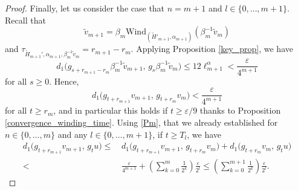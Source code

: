 \documentclass[10pt,a4paper]{amsart}
\begin{document}
\begin{proof}
Finally, let us consider the case that $n=m+1$ and $l\in \{0,\dots,m+1\}$. 
Recall that \[\tilde v_{m+1}=\beta_m \mathrm{Wind}_{(\tilde  H'_{m+1}, \alpha_{m+1})}(\beta_m^{-1} \tilde v_m)\] and $\tau_{\tilde H_{m+1}', \alpha_{m+1}, \beta_{m}^{-1}\tilde v_m} = r_{m+1}-r_m$. Applying Proposition \ref{key_prop}, we have
\[
d_1\big(g_{s+r_{m+1}-r_m} \beta_m^{-1}\tilde v_{m+1},\, g_{s} \beta_m^{-1} \tilde v_m\big) \le 12 \ell^{\alpha}_{m+1} < \frac{\varepsilon}{4^{m+1}}
\]
for all $s\ge 0$. Hence,
\[
d_1\big(g_{t+r_{m+1}} v_{m+1},\, g_{t+r_m} v_m\big) < \frac{\varepsilon}{4^{m+1}}
\]
for all $t\ge r_m$, and in particular this holds if $t\ge \varepsilon/ 9$ thanks to Proposition \ref{convergence_winding_time}. Using \ref{Pm}, that we already established for $n\in\{0,\dots,m\}$ and any $l\in \{0,\dots,m+1\}$, if $t\ge T_l$, we have
\begin{align*}
	d_1\big(g_{t+r_{m+1}} v_{m+1},\, g_t u\big) \le & \, d_1\big(g_{t+r_{m+1}} v_{m+1},\, g_{t+r_m} v_m\big) + d_1\big(g_{t+r_m} v_m,\, g_t u\big) \\
	 <& \, \frac{\varepsilon}{4^{m+1}} + \left(\sum_{k=0}^{m} \frac{1}{2^k}\right)\frac{\varepsilon}{2^l} \le \left(\sum_{k=0}^{m+1} \frac{1}{2^k}\right)\frac{\varepsilon}{2^l}.
\end{align*}

	
\end{proof}
\end{document}
